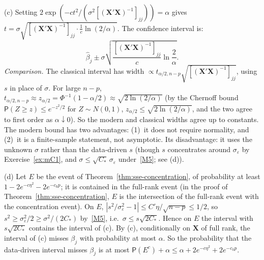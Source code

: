 \documentclass[12pt,a4paper]{article}
\theoremstyle{definition}
\newcommand\prb{\mathsf{P}}
\newcommand{\bX}{\mathbf{X}}
\begin{document}
(c) Setting $2\exp(-ct^2/(\sigma^2[(\bX'\bX)^{-1}]_{jj})) = \alpha$ gives $t = \sigma\sqrt{[(\bX'\bX)^{-1}]_{jj}\cdot\frac{1}{c}\ln(2/\alpha)}$. The confidence interval is:
\[
\hat\beta_j \pm \sigma\sqrt{\frac{[(\bX'\bX)^{-1}]_{jj}}{c}\ln\frac{2}{\alpha}}.
\]
\emph{Comparison.} The classical interval has width $\propto t_{\alpha/2,n-p}\sqrt{[(\bX'\bX)^{-1}]_{jj}}$, using $s$ in place of $\sigma$. For large $n-p$, $t_{\alpha/2,n-p} \approx z_{\alpha/2} = \Phi^{-1}(1-\alpha/2) \approx \sqrt{2\ln(2/\alpha)}$ (by the Chernoff bound $\prb(Z \geqslant z) \leqslant e^{-z^2/2}$ for $Z \sim N(0,1)$, $z_{\alpha/2} \leqslant \sqrt{2\ln(2/\alpha)}$, and the two agree to first order as $\alpha \downarrow 0$). So the modern and classical widths agree up to constants. The modern bound has two advantages: (1)~it does not require normality, and (2)~it is a finite-sample statement, not asymptotic. Its disadvantage: it uses the unknown $\sigma$ rather than the data-driven $s$ (though $s$ concentrates around $\sigma_\varepsilon$ by Exercise~\ref{ex:mC1}, and $\sigma \leqslant \sqrt{C_*}\,\sigma_\varepsilon$ under~\ref{M5}; see (d)).

(d) Let $E$ be the event of Theorem~\ref{thm:sse-concentration}, of probability at least $1 - 2e^{-c\eta^2} - 2e^{-c_0p}$; it is contained in the full-rank event (in the proof of Theorem~\ref{thm:sse-concentration}, $E$ is the intersection of the full-rank event with the concentration event). On $E$, $|s^2/\sigma_\varepsilon^2 - 1| \leqslant C'\eta/\sqrt{n-p} \leqslant 1/2$, so $s^2 \geqslant \sigma_\varepsilon^2/2 \geqslant \sigma^2/(2C_*)$ by~\ref{M5}, i.e.\ $\sigma \leqslant s\sqrt{2C_*}$. Hence on $E$ the interval with $s\sqrt{2C_*}$ contains the interval of (c). By (c), conditionally on $\bX$ of full rank, the interval of (c) misses $\beta_j$ with probability at most $\alpha$. So the probability that the data-driven interval misses $\beta_j$ is at most $\prb(E^c) + \alpha \leqslant \alpha + 2e^{-c\eta^2} + 2e^{-c_0p}$.
\end{document}
